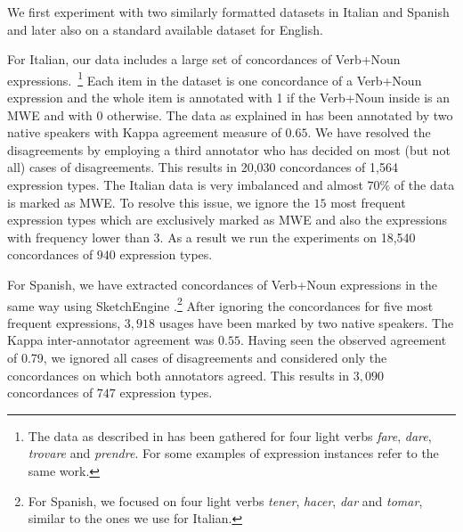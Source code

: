 \documentclass[output=paper
,modfonts
,nonflat]{langsci/langscibook}
\begin{document}
We first experiment with two similarly formatted datasets in Italian and Spanish and later also on a %
standard available dataset for English.

For Italian, our data includes a large set of concordances of Verb+Noun expressions.~\footnote{The data as described in \cite{Taslimipoor2016} has been gathered for four light verbs \textit{fare}, \textit{dare}, \textit{trovare} and \textit{prendre}. For some examples of expression instances refer to the same work.} %
Each item in the dataset is one concordance of a Verb+Noun expression and the whole item is annotated with 1 if the Verb+Noun inside is an MWE and with 0 otherwise.
The data as explained in \cite{Taslimipoor2016} has been annotated by two native speakers with Kappa agreement measure of $0.65$. We have resolved the disagreements by employing a third annotator who has decided on most (but not all) cases of disagreements. This results in 20,030 concordances of 1,564 expression types. The Italian data is very imbalanced and almost $70\%$ of the data is marked as MWE. To resolve this issue, we ignore the $15$ most frequent expression types which are exclusively marked as MWE and also the expressions with frequency lower than $3$. As a result we run the experiments on 18,540 concordances of $940$ expression types.

For Spanish, we have extracted concordances of Verb+Noun expressions in the same way using SketchEngine \citep{kilgarriff2004}.\footnote{For Spanish, we focused on four light verbs \textit{tener}, \textit{hacer}, \textit{dar} and \textit{tomar}, similar to the ones we use for Italian.} After ignoring the concordances for five most frequent expressions, $3,918$ usages have been marked by two native speakers. The Kappa inter-annotator agreement was $0.55$. Having seen the observed agreement of 0.79, we ignored all cases of disagreements and considered only the concordances on which both annotators agreed. 
This results in $3,090$ concordances of $747$ expression types.  
\end{document}
